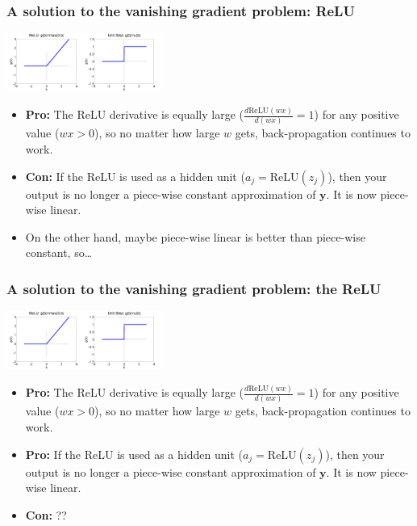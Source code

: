 \documentclass{beamer}
\begin{document}
\begin{frame}
  \frametitle{A solution to the vanishing gradient problem: ReLU}
  \centerline{\includegraphics[width=1in]{figs/nn_relu.png}\includegraphics[width=1in]{figs/nn_unitstep.png}}

  \begin{itemize}
    \item {\bf Pro:} The ReLU derivative is equally large
      ($\frac{d\mbox{ReLU}(wx)}{d(wx)}=1$) for any positive value
      ($wx>0$), so no matter how large $w$ gets, back-propagation
      continues to work.
    \item {\bf Con:} If the ReLU is used as a hidden unit
      ($a_j=\mbox{ReLU}(z_j)$), then your output is no longer a
      piece-wise constant approximation of $\mathbf{y}$.  It is now
      piece-wise linear.
    \item On the other hand, maybe piece-wise linear is
      better than piece-wise constant, so\ldots
  \end{itemize}
\end{frame}
      
\begin{frame}
  \frametitle{A solution to the vanishing gradient problem: the ReLU}
  \centerline{\includegraphics[width=1in]{figs/nn_relu.png}\includegraphics[width=1in]{figs/nn_unitstep.png}}

  \begin{itemize}
    \item {\bf Pro:} The ReLU derivative is equally large
      ($\frac{d\mbox{ReLU}(wx)}{d(wx)}=1$) for any positive value
      ($wx>0$), so no matter how large $w$ gets, back-propagation
      continues to work.
    \item {\bf Pro:} If the ReLU is used as a hidden unit
      ($a_j=\mbox{ReLU}(z_j)$), then your output is no longer a
      piece-wise constant approximation of $\mathbf{y}$.  It is now
      piece-wise linear.
    \item {\bf Con:} ??
  \end{itemize}
\end{frame}
\end{document}
